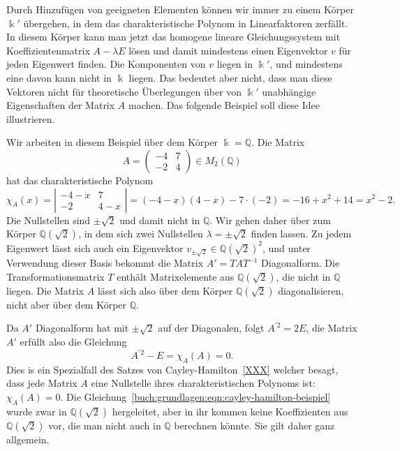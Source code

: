 Durch Hinzufügen von geeigneten Elementen können wir immer zu einem 
Körper $\Bbbk'$ übergehen, in dem das charakteristische Polynom
in Linearfaktoren zerfällt.
In diesem Körper kann man jetzt das homogene lineare Gleichungssystem
mit Koeffizientenmatrix $A-\lambda E$ lösen und damit mindestens 
einen Eigenvektor $v$ für jeden Eigenwert finden.
Die Komponenten von $v$ liegen in $\Bbbk'$, und mindestens eine davon kann
nicht in $\Bbbk$ liegen.
Das bedeutet aber nicht, dass man diese Vektoren nicht für theoretische
Überlegungen über von $\Bbbk'$ unabhängige Eigenschaften der Matrix $A$ machen.
Das folgende Beispiel soll diese Idee illustrieren.

\begin{beispiel}
Wir arbeiten in diesem Beispiel über dem Körper $\Bbbk=\mathbb{Q}$.
Die Matrix
\[
A=\begin{pmatrix}
-4&7\\
-2&4
\end{pmatrix}
\in
M_2(\mathbb{Q})
\]
hat das charakteristische Polynom
\[
\chi_A(x)
=
\left|
\begin{matrix}
-4-x&7\\-2&4-x
\end{matrix}
\right|
=
(-4-x)(4-x)-7\cdot(-2)
=
-16+x^2+14
=
x^2-2.
\]
Die Nullstellen sind $\pm\sqrt{2}$ und damit nicht in $\mathbb{Q}$.
Wir gehen daher über zum Körper $\mathbb{Q}(\!\sqrt{2})$, in dem
sich zwei Nullstellen $\lambda=\pm\sqrt{2}$ finden lassen.
Zu jedem Eigenwert lässt sich auch ein Eigenvektor
$v_{\pm\sqrt{2}}\in \mathbb{Q}(\!\sqrt{2})^2$, und unter Verwendung dieser
Basis bekommt die Matrix $A'=TAT^{-1}$ Diagonalform.
Die Transformationsmatrix $T$ enthält Matrixelemente aus
$\mathbb{Q}(\!\sqrt{2})$, die nicht in $\mathbb{Q}$ liegen.
Die Matrix $A$ lässt sich also über dem Körper $\mathbb{Q}(\!\sqrt{2})$
diagonalisieren, nicht aber über dem Körper $\mathbb{Q}$.

Da $A'$ Diagonalform hat mit $\pm\sqrt{2}$ auf der Diagonalen, folgt
$A^{\prime 2} = 2E$, die Matrix $A'$ erfüllt also die Gleichung
\begin{equation}
A^{\prime 2}-E= \chi_{A}(A) = 0.
\label{buch:grundlagen:eqn:cayley-hamilton-beispiel}
\end{equation}
Dies is ein Spezialfall des Satzes von Cayley-Hamilton~\ref{XXX}
welcher besagt, dass jede Matrix $A$ eine Nullstelle ihres 
charakteristischen Polynoms ist: $\chi_A(A)=0$.
Die Gleichung~\ref{buch:grundlagen:eqn:cayley-hamilton-beispiel}
wurde zwar in $\mathbb{Q}(\!\sqrt{2})$ hergeleitet, aber in ihr kommen
keine Koeffizienten aus $\mathbb{Q}(\!\sqrt{2})$ vor, die man nicht auch
in $\mathbb{Q}$ berechnen könnte.
Sie gilt daher ganz allgemein.
\end{beispiel}

